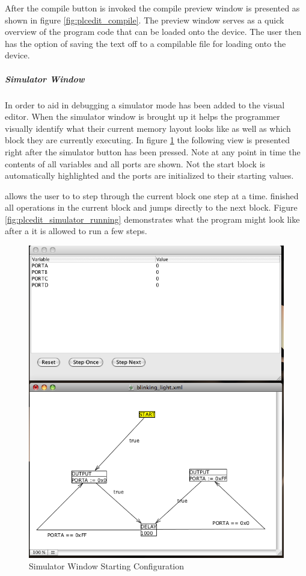 After the compile button is invoked the compile preview window is presented as shown in figure \ref{fig:plcedit_compile}. The preview window serves as a quick overview of the program code that can be loaded onto the device. The user then has the option of saving the text off to a compilable file for loading onto the device.

\subparagraph{Simulator Window}

In order to aid in debugging a simulator mode has been added to the visual editor. When the simulator window is brought up it helps the programmer visually identify what their current memory layout looks like as well as which block they are currently executing. In figure \ref{fig:plcedit_simulator_start} the following view is presented right after the simulator button has been pressed. Note at any point in time the contents of all variables and all ports are shown. Not the start block is automatically highlighted and the ports are initialized to their starting values.

 allows the user to to step through the current block one step at a time.  finished all operations in the current block and jumps directly to the next block. Figure \ref{fig:plcedit_simulator_running} demonstrates what the program might look like after a it is allowed to run a few steps.

\begin{figure}[htp]
    \centering
    \includegraphics[width=\imgmedium]{./images/plcedit_simulator_start.png}
    \caption{Simulator Window Starting Configuration}
    \label{fig:plcedit_simulator_start}
\end{figure}



